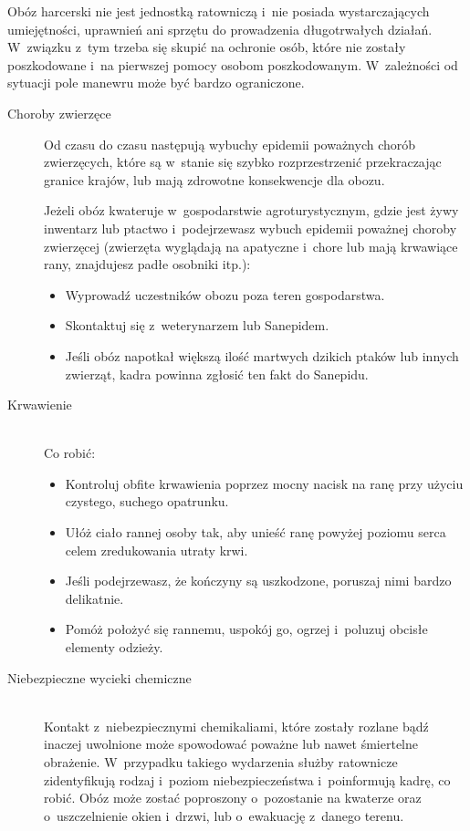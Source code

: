 \documentclass[a5paper,10pt,titlepage,twoside]{article}
\begin{document}
Obóz harcerski nie jest jednostką ratowniczą i~nie posiada wystarczających umiejętności, uprawnień ani sprzętu do prowadzenia długotrwałych działań. W~związku z~tym trzeba się skupić na ochronie osób, które nie zostały poszkodowane i~na pierwszej pomocy osobom poszkodowanym. W~zależności od sytuacji pole manewru może być bardzo ograniczone.
\begin{description}
\item[Choroby zwierzęce] Od czasu do czasu następują wybuchy epidemii poważnych chorób zwierzęcych, które są w~stanie się szybko rozprzestrzenić przekraczając granice krajów, lub mają zdrowotne konsekwencje dla obozu.

Jeżeli obóz kwateruje w~gospodarstwie agroturystycznym, gdzie jest żywy inwentarz lub ptactwo i~podejrzewasz wybuch epidemii poważnej choroby
zwierzęcej (zwierzęta wyglądają na apatyczne i~chore lub mają krwawiące rany, znajdujesz padłe osobniki itp.):

\begin{itemize}
\item Wyprowadź uczestników obozu poza teren gospodarstwa.
\item Skontaktuj się z~weterynarzem lub Sanepidem.
\item Jeśli obóz napotkał większą ilość martwych dzikich ptaków lub innych zwierząt, kadra powinna zgłosić ten fakt do Sanepidu.
\end{itemize}
\item[Krwawienie] \hfill \\ Co robić:
\begin{itemize}
\item Kontroluj obfite krwawienia poprzez mocny nacisk na ranę przy użyciu czystego, suchego opatrunku.
\item Ułóż ciało rannej osoby tak, aby unieść ranę powyżej poziomu serca celem zredukowania utraty krwi.
\item Jeśli podejrzewasz, że kończyny są uszkodzone, poruszaj nimi bardzo delikatnie.
\item Pomóż położyć się rannemu, uspokój go, ogrzej i~poluzuj obcisłe elementy odzieży.
\end{itemize}
\item[Niebezpieczne wycieki chemiczne] \hfill \\ Kontakt z~niebezpiecznymi chemikaliami, które zostały rozlane bądź inaczej uwolnione może spowodować poważne lub nawet śmiertelne obrażenie. W~przypadku takiego wydarzenia służby ratownicze zidentyfikują rodzaj i~poziom niebezpieczeństwa i~poinformują kadrę, co robić. Obóz może zostać poproszony o~pozostanie na kwaterze oraz o~uszczelnienie okien i~drzwi, lub o~ewakuację z~danego terenu.


\end{description}
\end{document}
